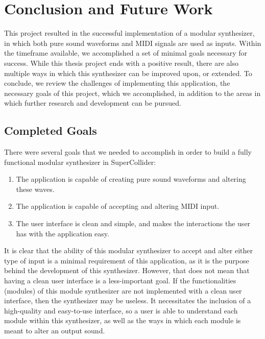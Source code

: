 \chapter{Conclusion and Future Work}\label{conclusion}

This project resulted in the successful implementation of a modular synthesizer, in which both pure sound waveforms and MIDI signals are used as inputs. Within the timeframe available, we accomplished a set of minimal goals necessary for success. While this thesis project ends with a positive result, there are also multiple ways in which this synthesizer can be improved upon, or extended. To conclude, we review the challenges of implementing this application, the necessary goals of this project, which we accomplished, in addition to the areas in which further research and development can be pursued. 



\section{Completed Goals}

There were several goals that we needed to accomplish in order to build a fully functional modular synthesizer in SuperCollider:

\begin{enumerate}
	\item The application is capable of creating pure sound waveforms and altering these waves.
	\item The application is capable of accepting and altering MIDI input.
	\item The user interface is clean and simple, and makes the interactions the user has with the application easy.
\end{enumerate}

It is clear that the ability of this modular synthesizer to accept and alter either type of input is a minimal requirement of this application, as it is the purpose behind the development of this synthesizer. However, that does not mean that having a clean user interface is a less-important goal. If the functionalities (modules) of this module synthesizer are not implemented with a clean user interface, then the synthesizer may be useless. It necessitates the inclusion of a high-quality and easy-to-use interface, so a user is able to understand each module within this synthesizer, as well as the ways in which each module is meant to alter an output sound. 


